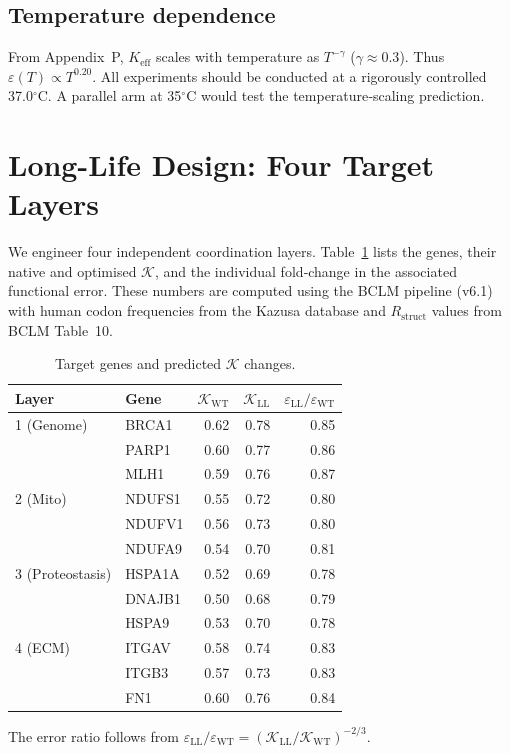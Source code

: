 \documentclass[12pt,a4paper]{article}
\newcommand{\REL}{\mathcal{K}}          %
\begin{document}
	\subsection{Temperature dependence}
	From Appendix~P, \(K_{\mathrm{eff}}\) scales with temperature as \(T^{-\gamma}\) (\(\gamma\approx0.3\)). Thus \(\varepsilon(T) \propto T^{0.20}\). All experiments should be conducted at a rigorously controlled 37.0\(^\circ\)C. A parallel arm at 35\(^\circ\)C would test the temperature‑scaling prediction.
	
	\section{Long-Life Design: Four Target Layers}
	\label{sec:layers}
	We engineer four independent coordination layers. Table~\ref{tab:targets} lists the genes, their native and optimised \(\REL\), and the individual fold‑change in the associated functional error. These numbers are computed using the BCLM pipeline (v6.1) with human codon frequencies from the Kazusa database and \(R_{\mathrm{struct}}\) values from BCLM Table~10.
	
	\begin{table}[H]
		\centering
		\caption{Target genes and predicted \(\REL\) changes.}
		\label{tab:targets}
		\begin{tabular}{@{}llrrr@{}}
			\toprule
			\textbf{Layer} & \textbf{Gene} & \(\REL_{\mathrm{WT}}\) & \(\REL_{\mathrm{LL}}\) & \(\varepsilon_{\mathrm{LL}}/\varepsilon_{\mathrm{WT}}\) \\
			\midrule
			1 (Genome) & BRCA1 & 0.62 & 0.78 & 0.85 \\
			& PARP1 & 0.60 & 0.77 & 0.86 \\
			& MLH1  & 0.59 & 0.76 & 0.87 \\
			2 (Mito)   & NDUFS1 & 0.55 & 0.72 & 0.80 \\
			& NDUFV1 & 0.56 & 0.73 & 0.80 \\
			& NDUFA9 & 0.54 & 0.70 & 0.81 \\
			3 (Proteostasis) & HSPA1A & 0.52 & 0.69 & 0.78 \\
			& DNAJB1 & 0.50 & 0.68 & 0.79 \\
			& HSPA9  & 0.53 & 0.70 & 0.78 \\
			4 (ECM)    & ITGAV  & 0.58 & 0.74 & 0.83 \\
			& ITGB3  & 0.57 & 0.73 & 0.83 \\
			& FN1    & 0.60 & 0.76 & 0.84 \\
			\bottomrule
		\end{tabular}
		\footnotesize The error ratio follows from \(\varepsilon_{\mathrm{LL}}/\varepsilon_{\mathrm{WT}} = (\REL_{\mathrm{LL}}/\REL_{\mathrm{WT}})^{-2/3}\).
	\end{table}
	
\end{document}
